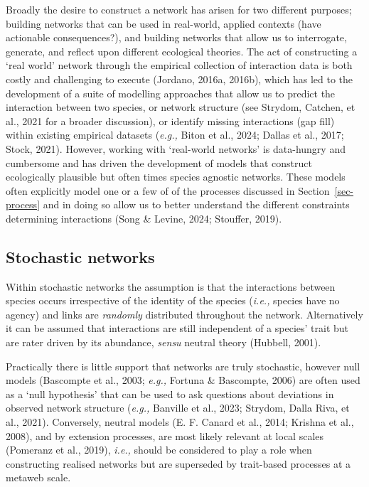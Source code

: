 \documentclass[
]{article}
\begin{document}
Broadly the desire to construct a network has arisen for two different
purposes; building networks that can be used in real-world, applied
contexts (have actionable consequences?), and building networks that
allow us to interrogate, generate, and reflect upon different ecological
theories. The act of constructing a `real world' network through the
empirical collection of interaction data is both costly and challenging
to execute (Jordano, 2016a, 2016b), which has led to the development of
a suite of modelling approaches that allow us to predict the interaction
between two species, or network structure (see Strydom, Catchen, et al.,
2021 for a broader discussion), or identify missing interactions (gap
fill) within existing empirical datasets (\emph{e.g.,} Biton et al.,
2024; Dallas et al., 2017; Stock, 2021). However, working with
`real-world networks' is data-hungry and cumbersome and has driven the
development of models that construct ecologically plausible but often
times species agnostic networks. These models often explicitly model one
or a few of of the processes discussed in Section~\ref{sec-process} and
in doing so allow us to better understand the different constraints
determining interactions (Song \& Levine, 2024; Stouffer, 2019).

\subsection{Stochastic networks}\label{stochastic-networks}

Within stochastic networks the assumption is that the interactions
between species occurs irrespective of the identity of the species
(\emph{i.e.,} species have no agency) and links are \emph{randomly}
distributed throughout the network. Alternatively it can be assumed that
interactions are still independent of a species' trait but are rater
driven by its abundance, \emph{sensu} neutral theory (Hubbell, 2001).

Practically there is little support that networks are truly stochastic,
however null models (Bascompte et al., 2003; \emph{e.g.,} Fortuna \&
Bascompte, 2006) are often used as a `null hypothesis' that can be used
to ask questions about deviations in observed network structure
(\emph{e.g.,} Banville et al., 2023; Strydom, Dalla Riva, et al., 2021).
Conversely, neutral models (E. F. Canard et al., 2014; Krishna et al.,
2008), and by extension processes, are most likely relevant at local
scales (Pomeranz et al., 2019), \emph{i.e.,} should be considered to
play a role when constructing realised networks but are superseded by
trait-based processes at a metaweb scale.
\end{document}
